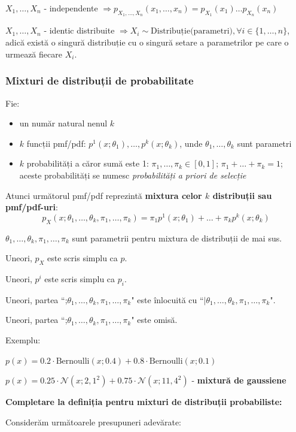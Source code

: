 \documentclass[12pt]{article}
\begin{document}
	$X_1, \dots, X_n$ - independente $\Rightarrow p_{X_1,\dots,X_n}(x_1,\dots,x_n) = p_{X_1}(x_1)\dots p_{X_n}(x_n)$
	
	$X_1, \dots, X_n$ - identic distribuite $\Rightarrow X_i \sim \text{Distribuție(parametri)},\forall i \in\{1,\dots,n\}$, adică există o singură distribuție cu o singură setare a parametrilor pe care o urmează fiecare $X_i$.
	
	\subsubsection{Mixturi de distribuții de probabilitate}
	
	Fie:
	\begin{itemize}
		\item un număr natural nenul $k$
		\item $k$ funcții pmf/pdf: $p^1(x;\theta_1), \dots, p^k(x;\theta_k)$, unde $\theta_1, \dots, \theta_k$ sunt parametri
		\item $k$ probabilități a căror sumă este 1: $\pi_1,\dots,\pi_k \in [0,1]$; $\pi_1+\dots+\pi_k=1$; aceste probabilități se numesc \textit{probabilități a priori de selecție}
	\end{itemize}
	
	\noindent Atunci următorul pmf/pdf reprezintă \textbf{mixtura celor $k$ distribuții sau pmf/pdf-uri}:
	$$p_X(x;\theta_1,\dots,\theta_k,\pi_1,\dots,\pi_k) = \pi_1 p^1(x;\theta_1) + \dots + \pi_k p^k(x;\theta_k)$$
	
	$\theta_1,\dots,\theta_k,\pi_1,\dots,\pi_k$ sunt parametrii pentru mixtura de distribuții de mai sus.
	
	Uneori, $p_X$ este scris simplu ca $p$. 
	
	Uneori, $p^i$ este scris simplu ca $p_i$. 
	
	Uneori, partea ``;$\theta_1,\dots,\theta_k,\pi_1,\dots,\pi_k$" este înlocuită cu ``$|\theta_1,\dots,\theta_k,\pi_1,\dots,\pi_k$".
	
	Uneori, partea ``;$\theta_1,\dots,\theta_k,\pi_1,\dots,\pi_k$" este omisă.
		
	Exemplu: 
	
	$p(x) = 0.2 \cdot \text{Bernoulli}(x;0.4) + 0.8\cdot\text{Bernoulli}(x;0.1)$
		
	$p(x) = 0.25\cdot \mathcal{N}(x;2,1^2) + 0.75\cdot\mathcal{N}(x;11,4^2)$ - \textbf{mixtură de gaussiene}
	
	\textbf{Completare la definiția pentru mixturi de distribuții probabiliste:}
	
	Considerăm următoarele presupuneri adevărate:
	
\end{document}
